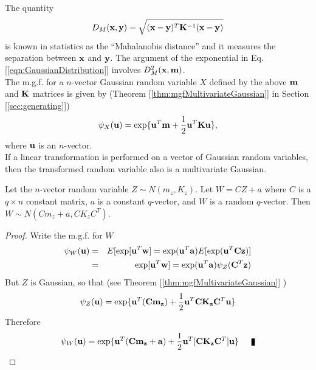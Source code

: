 The quantity $$D_M({\bf x}, {\bf y}) = \sqrt{({\bf x} - {\bf y})^T {\bf K}^{-1} ({\bf x} -{\bf y})}$$ is known in statistics as the  ``Mahalanobis distance'' \cite{Mahalanobis} and it measures the separation between ${\bf x}$ and ${\bf y}$. The argument of the exponential in Eq. [\ref{eqn:GaussianDistribution}] involves $D^2_M({\bf x},{\bf m})$.\\

The m.g.f. for a $n$-vector Gaussian random variable $X$ defined by the above ${\bf m}$ and ${\bf K}$ matrices is given by 
(Theorem [\ref{thm:mgfMultivariateGaussian}] in Section [\ref{sec:generating}])
$$\psi_X({\bf u}) = \exp\{ {\bf u}^T{\bf m} + {1\over2}{\bf u}^T{\bf K u} \}, $$ where ${\bf u}$ is an $n$-vector. \\

If a linear transformation is performed on a vector of Gaussian random variables, then the transformed random variable also is a multivariate Gaussian.
\begin{theorem}
\label{thm:Gaussian}
Let the $n$-vector random variable $Z \sim N(m_z, K_z)$. Let $W = CZ + a$ where $C$ is a $q\times n$ constant matrix, $a$ is a constant $q$-vector, and $W$ is a random $q$-vector. Then $W \sim N(Cm_z + a, CK_zC^T)$.  
\end{theorem}
\begin{proof}
Write the m.g.f. for $W$
\begin{eqnarray*}
\psi_W({\bf u}) &=& E[\exp[{\bf u}^T{\bf w}] = \exp({\bf u}^T{\bf a}) E[\exp({\bf u}^T{\bf C}{\bf z})] \\
&=& \exp[{\bf u}^T{\bf w}] = \exp({\bf u}^T{\bf a}) \psi_Z({\bf C}^T{\bf z}) 
\end{eqnarray*}
But $Z$ is Gaussian, so that  (see Theorem [\ref{thm:mgfMultivariateGaussian}] )
$$\psi_Z({\bf u}) = \exp\{ {\bf u}^T({\bf C m_z}) + {1\over2}{\bf u}^T{\bf C K_z}{\bf C}^T{\bf u} \}$$
Therefore 
$$\psi_W({\bf u}) = \exp\{ {\bf u}^T({\bf C m_z} + {\bf a})  + {1\over2}{\bf u}^T[{\bf C K_z}{\bf C}^T]{\bf u} \}\qed$$
\end{proof}

